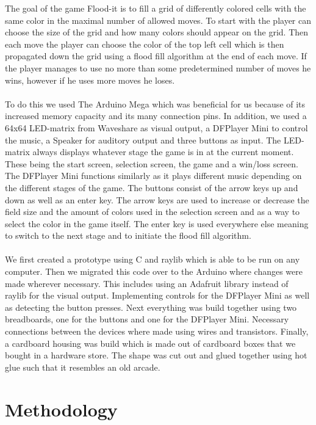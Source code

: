 \documentclass[10pt, a4paper]{article}
\begin{document}
The goal of the game Flood-it is to fill a grid of differently colored cells with the same color in the maximal number of allowed moves. To start with the player can choose the size of the grid and how many colors should appear on the grid. Then each move the player can choose the color of the top left cell which is then propagated down the grid using a flood fill algorithm at the end of each move. If the player manages to use no more than some predetermined number of moves he wins, however if he uses more moves he loses.\\\\
To do this we used The Arduino Mega which was beneficial for us because of its increased memory capacity and its many connection pins. In addition, we used a 64x64 LED-matrix from Waveshare as visual output, a DFPlayer Mini to control the music, a Speaker for auditory output and three buttons as input. The LED-matrix always displays whatever stage the game is in at the current moment. These being the start screen, selection screen, the game and a win/loss screen. The DFPlayer Mini functions similarly as it plays different music depending on the different stages of the game. The buttons consist of the arrow keys up and down as well as an enter key. The arrow keys are used to increase or decrease the field size and the amount of colors used in the selection screen and as a way to select the color in the game itself. The enter key is used everywhere else meaning to switch to the next stage and to initiate the flood fill algorithm.\\\\
We first created a prototype using C and raylib which is able to be run on any computer. Then we migrated this code over to the Arduino where changes were made wherever necessary. This includes using an Adafruit library instead of raylib for the visual output. Implementing controls for the DFPlayer Mini as well as detecting the button presses. Next everything was build together using two breadboards, one for the buttons and one for the DFPlayer Mini. Necessary connections between the devices where made using wires and transistors. Finally, a cardboard housing was build which is made out of cardboard boxes that we bought in a hardware store. The shape was cut out and glued together using hot glue such that it resembles an old arcade.

\section*{Methodology}
\end{document}
